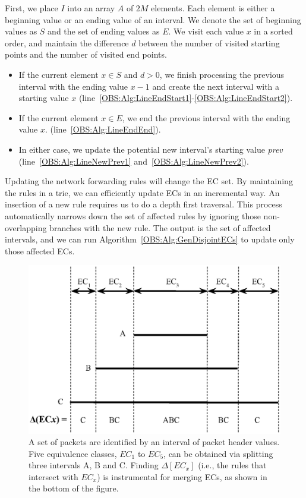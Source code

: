 First, we place $I$ into an array $A$ of $2M$ elements. Each element is either a beginning value or an ending value of an interval. We denote the set of beginning values as $S$ and the set of ending values as $E$. We visit each value $x$ in a sorted order, and maintain the difference $d$ between the number of visited starting points and the number of visited end points.
\begin{itemize}
\item If the current element $x \in S$ and $d > 0$,
        we finish processing the previous interval with the ending value $x - 1$ and
        create the next interval with a starting value $x$
        (line~\ref{OBS:Alg:LineEndStart1}-\ref{OBS:Alg:LineEndStart2}).
\item If the current element $x \in E$, we end the previous interval with the ending value $x$.
        (line~\ref{OBS:Alg:LineEndEnd}).
\item In either case, we update the potential new interval's starting value \textit{prev}
        (line~\ref{OBS:Alg:LineNewPrev1} and~\ref{OBS:Alg:LineNewPrev2}).
\end{itemize}

Updating the network forwarding rules will change the EC set.
By maintaining the rules in a trie, we can efficiently update ECs in an incremental way. An insertion of a new rule requires us to do a depth first traversal. This process automatically narrows down the set of affected rules by ignoring those non-overlapping branches with the new rule.
The output is the set of affected intervals, and we can run Algorithm~\ref{OBS:Alg:GenDisjointECs} to update only those affected ECs.

\begin{figure}[t]
\centering
\includegraphics[scale=.52]{OneBigSwitch/figures/DisjointECs.eps}
\caption[Equivalence Classes as Disjoint Intervals]{A set of packets are identified by
    an interval of packet header values.
    Five equivalence classes, $EC_1$ to $EC_5$, can be obtained via splitting three intervals
    A, B and C.
    Finding $\Delta[EC_x]$ (i.e., the rules that intersect with $EC_x$) is instrumental for
    merging ECs, as shown in the bottom of the figure.}
\label{OBS:Fig:DisjointECsAsInterval}
\end{figure}

